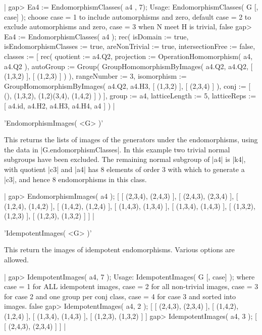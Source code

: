{|    gap> Ea4 := EndomorphismClasses( a4 , 7);
    Usage:  EndomorphismClasses( G [, case] );
     choose  case = 1  to include automorphisms and zero,
    default  case = 2  to exclude automorphisms and zero,
             case = 3  when  N meet H  is trivial,
    false
    gap> Ea4 := EndomorphismClasses( a4 );
    rec(
      isDomain := true,
      isEndomorphismClasses := true,
      areNonTrivial := true,
      intersectionFree := false,
      classes := [ rec(
              quotient := a4.Q2,
              projection := OperationHomomorphism( a4, a4.Q2 ),
              autoGroup := Group( GroupHomomorphismByImages( a4.Q2, a4.Q2, 
                [ (1,3,2) ], [ (1,2,3) ] ) ),
              rangeNumber := 3,
              isomorphism := GroupHomomorphismByImages( a4.Q2, a4.H3, 
                [ (1,3,2) ], [ (2,3,4) ] ),
              conj := [ (), (1,3,2), (1,2)(3,4), (1,4,2) ] ) ],
      group := a4,
      latticeLength := 5,
      latticeReps := [ a4.id, a4.H2, a4.H3, a4.H4, a4 ] ) |

%

'EndomorphismImages( <G> )'

This returns the lists of images of the generators under the endomorphisms,
using the data in  |G.endomorphismClasses|.
In this example two trivial normal subgroups have been excluded.
The remaining normal subgroup of |a4| is |k4|, with quotient |c3|
and |a4| has 8 elements of order 3 with which to generate a |c3|, 
and hence 8 endomorphisms in this class.

|    gap> EndomorphismImages( a4 );
    [ [ (2,3,4), (2,4,3) ], [ (2,4,3), (2,3,4) ], [ (1,2,4), (1,4,2) ], 
      [ (1,4,2), (1,2,4) ], [ (1,4,3), (1,3,4) ], [ (1,3,4), (1,4,3) ], 
      [ (1,3,2), (1,2,3) ], [ (1,2,3), (1,3,2) ] ]  |

%

'IdempotentImages( <G> )'

This return the images of idempotent endomorphisms.
Various options are allowed.

|    gap> IdempotentImages( a4, 7 );
    Usage: IdempotentImages( G [, case] );
    where  case = 1  for ALL idempotent images,
           case = 2  for all non-trivial images,
           case = 3  for case 2 and one group per conj class,
           case = 4  for case 3 and sorted into images.
    false
    gap> IdempotentImages( a4, 2 );
    [ [ (2,4,3), (2,3,4) ], [ (1,4,2), (1,2,4) ], [ (1,3,4), (1,4,3) ], 
      [ (1,2,3), (1,3,2) ] ]
    gap> IdempotentImages( a4, 3 );
    [ [ (2,4,3), (2,3,4) ] ]           |

}
